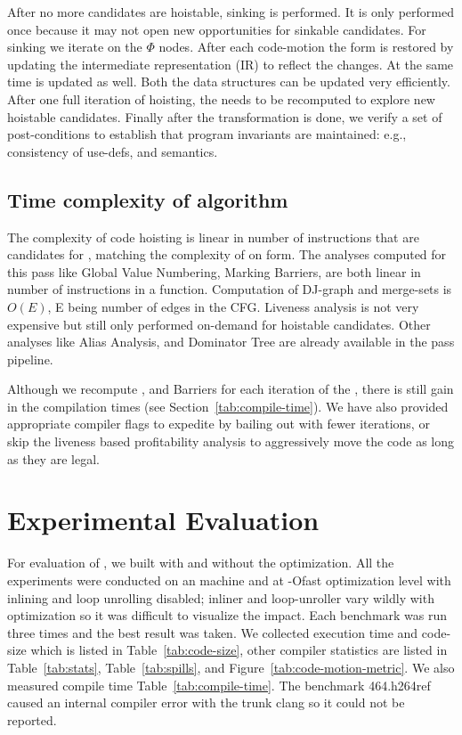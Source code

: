 \documentclass[sigplan,10pt,review,anonymous]{acmart}\settopmatter{printfolios=true,printccs=false,printacmref=false}
\begin{document}
After no more candidates are hoistable, sinking is performed. It is only
performed once because it may not open new opportunities for sinkable
candidates. For sinking we iterate on the $\Phi$ nodes. After each code-motion
the \SSA{} form is restored by updating the intermediate representation (IR) to
reflect the changes. At the same time \MemorySSA{} is updated as well. Both the
data structures can be updated very efficiently. After one full iteration of
hoisting, the \GVN{} needs to be recomputed to explore new hoistable candidates.
Finally after the transformation is done, we verify a set of post-conditions to
establish that program invariants are maintained: e.g., consistency of use-defs,
and \SSA{} semantics.


\subsection{Time complexity of algorithm}
The complexity of code hoisting is linear in number of instructions that are
candidates for \gcm{}, matching the complexity of \PRE{} on \SSA{} form.  The
analyses computed for this pass like Global Value Numbering, Marking Barriers,
are both linear in number of instructions in a function. Computation of DJ-graph
and merge-sets is $O(E)$, E being number of edges in the CFG. Liveness analysis
is not very expensive \cite{das2012} but still only performed on-demand for
hoistable candidates. Other analyses like Alias Analysis, \MemorySSA{} and
Dominator Tree are already available in the \LLVM{} pass pipeline.

Although we recompute \GVN{}, and Barriers for each iteration of the \gcm{},
there is still gain in the compilation times (see
Section~\ref{tab:compile-time}). We have also provided appropriate compiler
flags to expedite \gcm{} by bailing out with fewer iterations, or skip the
liveness based profitability analysis to aggressively move the code as long as
they are legal.

\section{Experimental Evaluation}
\label{sec:experimental-results}
For evaluation of \gcm{}, we built \SPEC{} with and without the \GCM{}
optimization. All the experiments were conducted on an \xlinux{} machine and at
-Ofast optimization level with inlining and loop unrolling disabled; inliner and
loop-unroller vary wildly with \GCM{} optimization so it was difficult to
visualize the impact. Each benchmark was run three times and the best result was
taken. We collected execution time and code-size which is listed in
Table~\ref{tab:code-size}, other compiler statistics are listed in
Table~\ref{tab:stats}, Table~\ref{tab:spills}, and
Figure~\ref{tab:code-motion-metric}.  We also measured compile time
Table~\ref{tab:compile-time}. The benchmark 464.h264ref caused an internal
compiler error with the trunk clang so it could not be reported.
\end{document}
